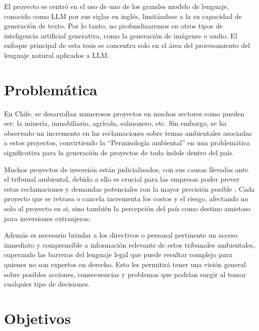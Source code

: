 El proyecto se centró en el uso de uno de los grandes modelo de lenguaje, conocido como LLM por sus siglas en inglés, limitándose a la su capacidad de 
generación de texto. Por lo tanto, no profundizaremos en otros tipos de inteligencia artificial generativa, como la 
generación de imágenes o audio. El enfoque principal de esta tesis se concentra solo en el área del procesamiento del lenguaje natural aplicados a LLM.

\newpage


\section{Problemática}

\par En Chile, se desarrollan numerosos proyectos en muchos sectores como pueden ser: la minería, inmobiliario, agrícola, salmonero, etc. Sin embargo, se ha observado un incremento en las reclamaciones 
sobre temas ambientales asociadas a estos proyectos, convirtiendo la ``Permisología ambiental'' en una problemática significativa para la generación de proyectos de toda índole dentro del país.

\par Muchos proyectos de inversión están judicializados, con sus causas llevadas ante el tribunal ambiental, debido a ello es crucial para las empresas poder prever estas reclamaciones y demandas 
potenciales con la mayor precisión posible \cite{p1}\cite{p2}\cite{p3}. Cada proyecto que se retrasa o cancela incrementa los costos y el riesgo, afectando no solo al proyecto en si, sino también la percepción del país como 
destino amistoso para inversiones extranjeras.

\par Además es necesario brindar a los directivos o personal pertinente un acceso inmediato y comprensible a información relevante de estos tribunales ambientales, superando las 
barreras del lenguaje legal que puede resultar complejo para quienes no son expertos en derecho. Esto les permitirá tener una visión general sobre posibles acciones, consecuencias y problemas que 
podrían surgir al tomar cualquier tipo de decisiones.

\section{Objetivos}

